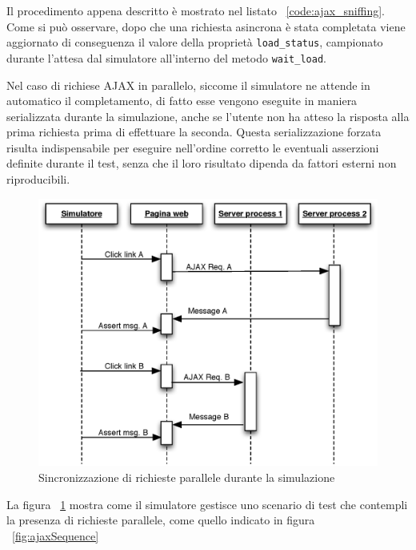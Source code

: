 \vspace{1cm}


Il procedimento appena descritto è mostrato nel listato ~\ref{code:ajax_sniffing}. Come si può osservare, dopo che una richiesta asincrona è stata completata viene aggiornato di conseguenza il valore della proprietà \verb|load_status|, campionato durante l'attesa dal simulatore all'interno del metodo \verb|wait_load|.

Nel caso di richiese AJAX in parallelo, siccome il simulatore ne attende in automatico il completamento, di fatto esse vengono eseguite in maniera serializzata durante la simulazione, anche se l'utente non ha atteso la risposta alla prima richiesta prima di effettuare la seconda. Questa serializzazione forzata risulta indispensabile per eseguire nell'ordine corretto le eventuali asserzioni definite durante il test, senza che il loro risultato dipenda da fattori esterni non riproducibili.

\begin{figure}[htbp]
\begin{center}
\includegraphics[width=\textwidth]{images/ajax_sync_for_simulation.eps}
\caption{Sincronizzazione di richieste parallele durante la simulazione}
\label{fig:ajaxParallelSimulation}
\end{center}
\end{figure}

La figura ~\ref{fig:ajaxParallelSimulation} mostra come il simulatore gestisce uno scenario di test che contempli la presenza di richieste parallele, come quello indicato in figura ~\ref{fig:ajaxSequence}

